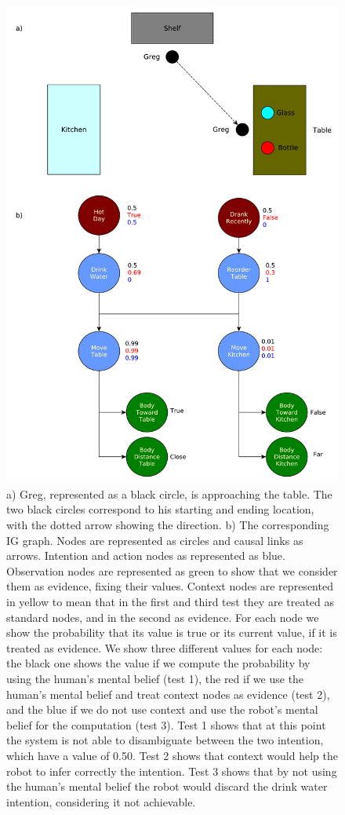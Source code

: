  \begin{figure}[ht!]
	\centering
	\includegraphics[scale=0.4]{img/situation_assessment/ig_exp1.pdf}
	\caption[IG Example 1]{a) Greg, represented as a black circle, is approaching the table. The two black circles correspond to his starting and ending location, with the dotted arrow showing the direction. b) The corresponding IG graph. Nodes are represented as circles and causal links as arrows. Intention and action nodes as represented as blue. Observation nodes are represented as green to show that we consider them as evidence, fixing their values. Context nodes are represented in yellow to mean that in the first and third test they are treated as standard nodes, and in the second as evidence.
 	 For each node we show the probability that its value is true or its current value, if it is treated as evidence. We show three different values for each node: the black one shows the value if we compute the probability by using the human's mental belief (test 1), the red if we use the human's mental belief and treat context nodes as evidence (test 2), and the blue if we do not use context and use the robot's mental belief for the computation (test 3). Test 1 shows that at this point the system is not able to disambiguate between the two intention, which have a value of 0.50. Test 2 shows that context would help the robot to infer correctly the intention. Test 3 shows that by not using the human's mental belief the robot would discard the drink water intention, considering it not achievable.}
	\label{fig:situation_assessment-ig_exp1}
\end{figure}

